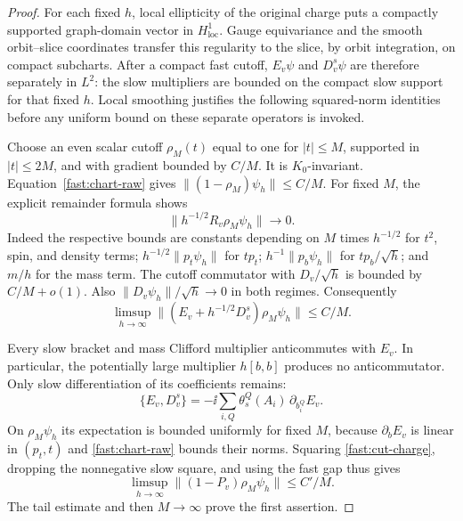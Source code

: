 \begin{proof}
For each fixed $h$, local ellipticity of the original charge puts a
compactly supported graph-domain vector in $H^1_{\mathrm{loc}}$.
Gauge equivariance and the smooth orbit--slice coordinates transfer
this regularity to the slice, by orbit integration, on compact subcharts. After a compact fast cutoff, $E_v\psi$ and $D_v^s\psi$
are therefore separately in $L^2$: the slow multipliers are bounded
on the compact slow support for that fixed $h$. Local smoothing
justifies the following squared-norm identities before any uniform
bound on these separate operators is invoked.

Choose an even scalar cutoff $\rho_M(t)$ equal to one for $|t|\leq M$,
supported in $|t|\leq2M$, and with gradient bounded by $C/M$. It is
$K_0$-invariant. Equation~\eqref{fast:chart-raw} gives
$\|(1-\rho_M)\psi_h\|\leq C/M$. For fixed $M$, the explicit remainder
formula shows
\[
 \|h^{-1/2}R_v\rho_M\psi_h\|\longrightarrow0.
\]
Indeed the respective bounds are constants depending on $M$ times
$h^{-1/2}$ for $t^2$, spin, and density terms;
$h^{-1/2}\|p_t\psi_h\|$ for $tp_t$;
$h^{-1}\|p_b\psi_h\|$ for $tp_b/\sqrt h$; and $m/h$ for the mass
term. The cutoff commutator with $D_v/\sqrt h$ is bounded by
$C/M+o(1)$. Also $\|D_v\psi_h\|/\sqrt h\to0$ in both regimes.
Consequently
\begin{equation}
 \limsup_{h\to\infty}
 \|(E_v+h^{-1/2}D_v^s)\rho_M\psi_h\|\leq C/M.
 \label{fast:cut-charge}
\end{equation}

Every slow bracket and mass Clifford multiplier anticommutes with
$E_v$. In particular, the potentially large multiplier $h[b,b]$
produces no anticommutator. Only slow differentiation of its
coefficients remains:
\[
 \{E_v,D_v^s\}
 =-\ii\sum_{i,Q}\theta_s^Q(A_i)\,\partial_{b_i^Q}E_v.
\]
On $\rho_M\psi_h$ its expectation is bounded uniformly for fixed
$M$, because $\partial_bE_v$ is linear in $(p_t,t)$ and
\eqref{fast:chart-raw} bounds their norms. Squaring
\eqref{fast:cut-charge}, dropping the nonnegative slow square, and
using the fast gap thus gives
\[
 \limsup_{h\to\infty}\|(1-P_v)\rho_M\psi_h\|\leq C'/M.
\]
The tail estimate and then $M\to\infty$ prove the first assertion.


\end{proof}
